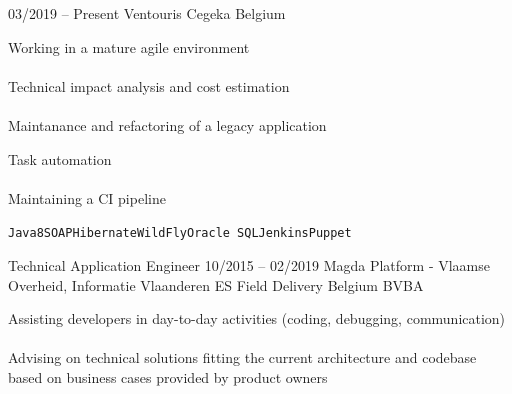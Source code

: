 \documentclass[9pt, blue, square]{developercv} %
\begin{document}
	\begin{entrylist}
		\entry
		{03/2019 -- Present}
		{Ventouris}
		{Cegeka Belgium}
		{\vspace{0.2cm}
			\begin{minipage}[t]{0.40\textwidth} %
				\vspace{-\baselineskip}
				\itemmarker Working in a mature agile environment\\
				\vspace{-3mm}\\
				\itemmarker Technical impact analysis and cost estimation\\
				\vspace{-3mm}\\			
				\itemmarker Maintanance and refactoring of a legacy application\\
			\end{minipage}
			\hfill
			\begin{minipage}[t]{0.40\textwidth} %
				\vspace{-\baselineskip}
				\itemmarker Task automation\\
				\vspace{-3mm}\\
				\itemmarker Maintaining a CI pipeline\\
			\end{minipage}
			\vspace{-5mm}
			\textcolor{text!65}{\texttt{Java8}\slashsep\texttt{SOAP}\slashsep\texttt{Hibernate}\slashsep\texttt{WildFly}\slashsep\texttt{Oracle SQL}\slashsep\texttt{Jenkins}\slashsep\texttt{Puppet}}}
		{Technical Application Engineer}
		\entry
		{10/2015 -- 02/2019}
		{Magda Platform - Vlaamse Overheid, Informatie Vlaanderen}
		{ES Field Delivery Belgium BVBA}
		{
			\vspace{0.2cm}
			\begin{minipage}[t]{0.40\textwidth} %
				\vspace{-\baselineskip}
				\itemmarker Assisting developers in day-to-day activities (coding, debugging, communication)\\
				\vspace{-3mm}\\
				\itemmarker Advising on technical solutions fitting the current architecture and codebase based on business cases provided by product owners\\
				\vspace{-3mm}\\

\end{minipage}}
\end{entrylist}
\end{document}
